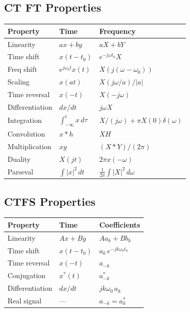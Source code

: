 \documentclass[11pt]{article}
\begin{document}
\subsection{CT FT Properties}
\begin{center}
\begin{tabular}{|l|l|l|}
\hline
Property & Time & Frequency\\
\hline
Linearity & $ax+by$ & $aX+bY$\\
Time shift & $x(t-t_0)$ & $e^{-j\omega t_0}X$\\
Freq shift & $e^{j\omega_0 t}x(t)$ & $X(j(\omega-\omega_0))$\\
Scaling & $x(at)$ & $X(j\omega/a)/|a|$\\
Time reversal & $x(-t)$ & $X(-j\omega)$\\
Differentiation & $dx/dt$ & $j\omega X$\\
Integration & $\int_{-\infty}^t x\,d\tau$ & $X/(j\omega)+\pi X(0)\delta(\omega)$\\
Convolution & $x*h$ & $XH$\\
Multiplication & $xy$ & $(X*Y)/(2\pi)$\\
Duality & $X(jt)$ & $2\pi x(-\omega)$\\
Parseval & $\int|x|^2\,dt$ & $\tfrac{1}{2\pi}\int|X|^2\,d\omega$\\
\hline
\end{tabular}
\end{center}

\subsection{CTFS Properties}
\begin{center}
\begin{tabular}{|l|l|l|}
\hline
Property & Time & Coefficients\\
\hline
Linearity & $Ax+By$ & $Aa_k + Bb_k$\\
Time shift & $x(t-t_0)$ & $a_k\, e^{-jk\omega_0 t_0}$\\
Time reversal & $x(-t)$ & $a_{-k}$\\
Conjugation & $x^*(t)$ & $a_{-k}^*$\\
Differentiation & $dx/dt$ & $jk\omega_0\, a_k$\\
Real signal & --- & $a_{-k} = a_k^*$\\
\hline
\end{tabular}
\end{center}
\end{document}
